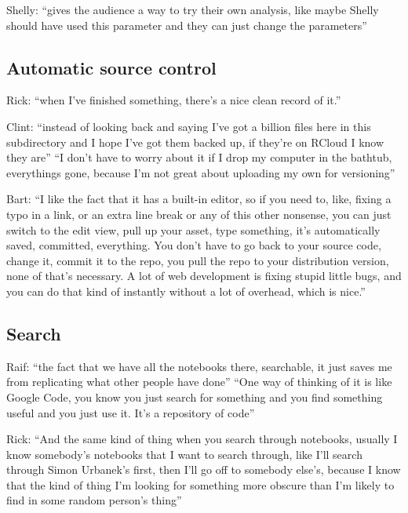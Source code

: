 Shelly: ``gives the audience a way to try their own analysis, like maybe Shelly
should have used this parameter and they can just change the parameters''


\subsection{Automatic source control}
Rick: ``when I've finished something, there's a nice clean record of it.''

Clint: ``instead of looking back and saying I've got a billion files here in
this subdirectory and I hope I've got them backed up, if they're on RCloud I
know they are'' ``I don't have to worry about it if I drop my computer in the
bathtub, everythings gone, because I'm not great about uploading my own for
versioning''

Bart: ``I like the fact that it has a built-in editor, so if you need to, like,
fixing a typo in a link, or an extra line break or any of this other nonsense,
you can just switch to the edit view, pull up your asset, type something, it's
automatically saved, committed, everything. You don't have to go back to your
source code, change it, commit it to the repo, you pull the repo to your
distribution version, none of that's necessary. A lot of web development is
fixing stupid little bugs, and you can do that kind of instantly without a lot
of overhead, which is nice.''


\subsection{Search}
Raif: ``the fact that we have all the notebooks there, searchable, it just saves
me from replicating what other people have done'' ``One way of thinking of it is
like Google Code, you know you just search for something and you find something
useful and you just use it. It’s a repository of code''

Rick: ``And the same kind of thing when you search through notebooks, usually I
know somebody’s notebooks that I want to search through, like I’ll search
through Simon Urbanek’s first, then I’ll go off to somebody else’s, because I
know that the kind of thing I’m looking for something more obscure than I’m
likely to find in some random person’s thing''


